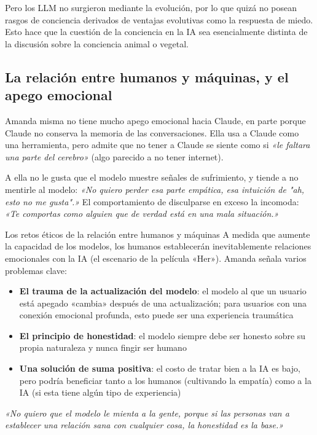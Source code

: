 \documentclass[a4paper]{article}
\begin{document}
Pero los LLM no surgieron mediante la evolución, por lo que quizá no posean rasgos de conciencia derivados de ventajas evolutivas como la respuesta de miedo. Esto hace que la cuestión de la conciencia en la IA sea esencialmente distinta de la discusión sobre la conciencia animal o vegetal.

\subsection{La relación entre humanos y máquinas, y el apego emocional}

Amanda misma no tiene mucho apego emocional hacia Claude, en parte porque Claude no conserva la memoria de las conversaciones. Ella usa a Claude como una herramienta, pero admite que no tener a Claude se siente como si \textit{«le faltara una parte del cerebro»} (algo parecido a no tener internet).

A ella no le gusta que el modelo muestre señales de sufrimiento, y tiende a no mentirle al modelo: \textit{«No quiero perder esa parte empática, esa intuición de "ah, esto no me gusta".»} El comportamiento de disculparse en exceso la incomoda: \textit{«Te comportas como alguien que de verdad está en una mala situación.»}

\begin{warningbox}{Los retos éticos de la relación entre humanos y máquinas}
A medida que aumente la capacidad de los modelos, los humanos establecerán inevitablemente relaciones emocionales con la IA (el escenario de la película «Her»). Amanda señala varios problemas clave:

\begin{itemize}
    \item \textbf{El trauma de la actualización del modelo}: el modelo al que un usuario está apegado «cambia» después de una actualización; para usuarios con una conexión emocional profunda, esto puede ser una experiencia traumática
    \item \textbf{El principio de honestidad}: el modelo siempre debe ser honesto sobre su propia naturaleza y nunca fingir ser humano
    \item \textbf{Una solución de suma positiva}: el costo de tratar bien a la IA es bajo, pero podría beneficiar tanto a los humanos (cultivando la empatía) como a la IA (si esta tiene algún tipo de experiencia)
\end{itemize}

\textit{«No quiero que el modelo le mienta a la gente, porque si las personas van a establecer una relación sana con cualquier cosa, la honestidad es la base.»}
\end{warningbox}
\end{document}
